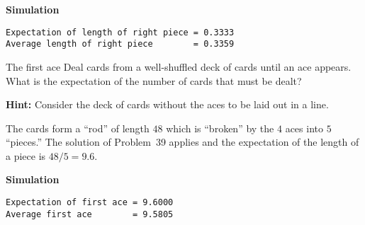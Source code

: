 \textbf{Simulation}
\begin{verbatim}
Expectation of length of right piece = 0.3333
Average length of right piece        = 0.3359
\end{verbatim}


\begin{prob}{The first ace}
Deal cards from a well-shuffled deck of cards until an ace appears. What is the expectation of the number of cards that must be dealt?

\textbf{Hint:} Consider the deck of cards without the aces to be laid out in a line.
\end{prob}

\solution{}

The cards form a ``rod'' of length $48$ which is ``broken'' by the $4$ aces into $5$ ``pieces.'' The solution of Problem~39 applies and the expectation of the length of a piece is $48/5=9.6$.

\textbf{Simulation}
\begin{verbatim}
Expectation of first ace = 9.6000
Average first ace        = 9.5805
\end{verbatim}



